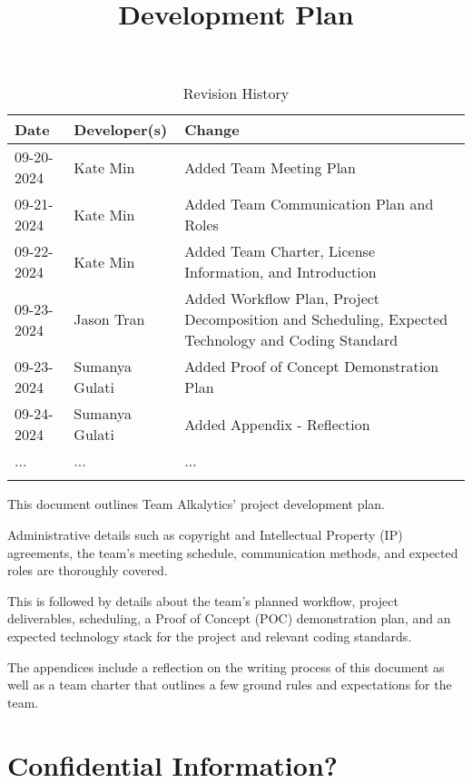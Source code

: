 \documentclass{article}
\title{Development Plan\\\progname}
\author{\authname}
\date{}
\begin{document}
\maketitle

\begin{table}[hp]
\caption{Revision History} \label{TblRevisionHistory}
\begin{tabularx}{\textwidth}{llX}
\toprule
\textbf{Date} & \textbf{Developer(s)} & \textbf{Change}\\
\midrule
09-20-2024 & Kate Min & Added Team Meeting Plan\\
09-21-2024 & Kate Min & Added Team Communication Plan and Roles\\
09-22-2024 & Kate Min & Added Team Charter, License Information, and
Introduction\\
09-23-2024 & Jason Tran & Added Workflow Plan, Project Decomposition and Scheduling, Expected Technology and
Coding Standard\\
09-23-2024 & Sumanya Gulati & Added Proof of Concept Demonstration Plan\\
09-24-2024 & Sumanya Gulati & Added Appendix - Reflection\\
... & ... & ...\\
\bottomrule
\label{table:1}
\end{tabularx}
\end{table}

\newpage{}

\noindent This document outlines Team Alkalytics' project development
plan.\newline

\noindent Administrative details such as copyright and Intellectual Property
(IP) agreements, the team's meeting schedule, communication methods, and
expected roles are thoroughly covered.\newline

\noindent This is followed by details about the team's planned workflow, project
deliverables, scheduling, a Proof of Concept (POC) demonstration plan, and an
expected technology stack for the project and relevant coding standards.\newline

\noindent The appendices include a reflection on the writing process of this
document as well as a team charter that outlines a few ground rules and
expectations for the team.

\section{Confidential Information?}
\end{document}

